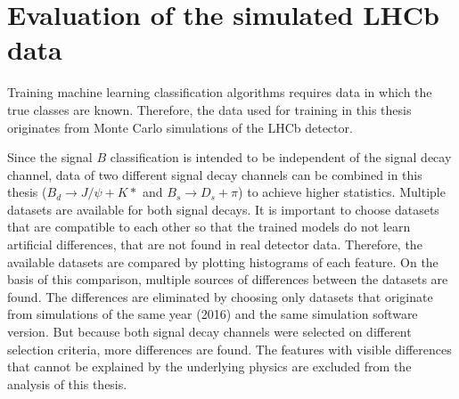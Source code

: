 \section{Evaluation of the simulated LHCb data}

Training machine learning classification algorithms requires data in which the true classes are known.
Therefore, the data used for training in this thesis originates from Monte Carlo simulations of the LHCb detector.

Since the signal $B$ classification is intended to be independent of the signal decay channel, data of two different signal decay channels can be combined in this thesis ($B_d \rightarrow J/\psi + K*$ and $B_s \rightarrow D_s + \pi$) to achieve higher statistics.
Multiple datasets are available for both signal decays. 
It is important to choose datasets that are compatible to each other so that the trained models do not learn artificial differences, that are not found in real detector data.
Therefore, the available datasets are compared by plotting histograms of each feature.
On the basis of this comparison, multiple sources of differences between the datasets are found.
The differences are eliminated by choosing only datasets that originate from simulations of the same year (2016) and the same simulation software version.
But because both signal decay channels were selected on different selection criteria, more differences are found.
The features with visible differences that cannot be explained by the underlying physics are excluded from the analysis of this thesis.




